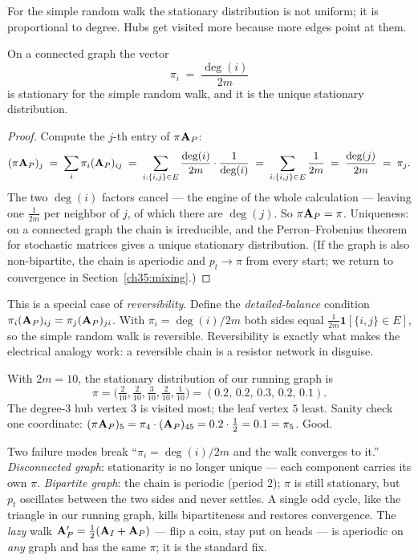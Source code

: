 For the simple random walk the stationary distribution is not uniform; it is proportional to degree. Hubs get visited more because more edges point at them.

\begin{theorem}\label{ch35:thm-stationary}
On a connected graph the vector
\[
  \pi_i \;=\; \frac{\deg(i)}{2m}
\]
is stationary for the simple random walk, and it is the unique stationary distribution.
\end{theorem}

\begin{proof}
Compute the $j$-th entry of $\pi\mathbf{A}_P$:
\[
  (\pi\mathbf{A}_P)_j \;=\; \sum_{i}\pi_i (\mathbf{A}_P)_{ij}
  \;=\; \sum_{i:\{i,j\}\in E}\frac{\deg(i)}{2m}\cdot\frac{1}{\deg(i)}
  \;=\; \sum_{i:\{i,j\}\in E}\frac{1}{2m}
  \;=\;\frac{\deg(j)}{2m}\;=\;\pi_j.
\]
The two $\deg(i)$ factors cancel --- the engine of the whole calculation --- leaving one $\frac{1}{2m}$ per neighbor of $j$, of which there are $\deg(j)$. So $\pi\mathbf{A}_P=\pi$. Uniqueness: on a connected graph the chain is irreducible, and the Perron--Frobenius theorem for stochastic matrices gives a unique stationary distribution. (If the graph is also non-bipartite, the chain is aperiodic and $p_t\to\pi$ from every start; we return to convergence in Section~\ref{ch35:mixing}.)
\end{proof}

This is a special case of \emph{reversibility}. Define the \emph{detailed-balance} condition $\pi_i (\mathbf{A}_P)_{ij}=\pi_j(\mathbf{A}_P)_{ji}$. With $\pi_i=\deg(i)/2m$ both sides equal $\frac{1}{2m}\mathbf{1}[\{i,j\}\in E]$, so the simple random walk is reversible. Reversibility is exactly what makes the electrical analogy work: a reversible chain is a resistor network in disguise.

\begin{example}\label{ch35:ex-stationary}
With $2m=10$, the stationary distribution of our running graph is
\[
  \pi=\Big(\tfrac{2}{10},\tfrac{2}{10},\tfrac{3}{10},\tfrac{2}{10},\tfrac{1}{10}\Big)
  =(0.2,\,0.2,\,0.3,\,0.2,\,0.1).
\]
The degree-$3$ hub vertex $3$ is visited most; the leaf vertex $5$ least. Sanity check one coordinate: $(\pi\mathbf{A}_P)_5 = \pi_4\cdot(\mathbf{A}_P)_{45}=0.2\cdot\tfrac12=0.1=\pi_5$. Good.
\end{example}

\begin{trapbox}
Two failure modes break ``$\pi_i=\deg(i)/2m$ and the walk converges to it.''
\emph{Disconnected graph}: stationarity is no longer unique --- each component carries its own $\pi$. \emph{Bipartite graph}: the chain is periodic (period $2$); $\pi$ is still stationary, but $p_t$ oscillates between the two sides and never settles. A single odd cycle, like the triangle in our running graph, kills bipartiteness and restores convergence. The \emph{lazy} walk $\mathbf{A}_P'=\tfrac12(\mathbf{A}_I+\mathbf{A}_P)$ --- flip a coin, stay put on heads --- is aperiodic on \emph{any} graph and has the same $\pi$; it is the standard fix.
\end{trapbox}

